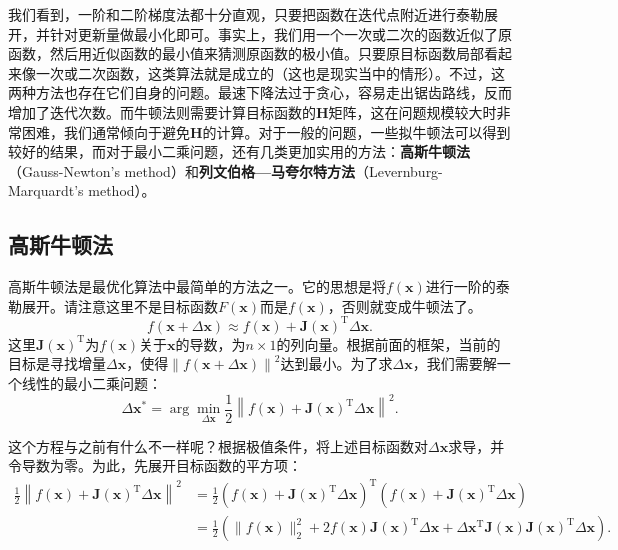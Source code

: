 我们看到，一阶和二阶梯度法都十分直观，只要把函数在迭代点附近进行泰勒展开，并针对更新量做最小化即可。事实上，我们用一个一次或二次的函数近似了原函数，然后用近似函数的最小值来猜测原函数的极小值。只要原目标函数局部看起来像一次或二次函数，这类算法就是成立的（这也是现实当中的情形）。不过，这两种方法也存在它们自身的问题。最速下降法过于贪心，容易走出锯齿路线，反而增加了迭代次数。而牛顿法则需要计算目标函数的$\bm{H}$矩阵，这在问题规模较大时非常困难，我们通常倾向于避免$\bm{H}$的计算。对于一般的问题，一些拟牛顿法可以得到较好的结果，而对于最小二乘问题，还有几类更加实用的方法：\textbf{高斯牛顿法}（Gauss-Newton's method）和\textbf{列文伯格—马夸尔特方法}（Levernburg-Marquardt's method）。

\subsection{高斯牛顿法}
高斯牛顿法是最优化算法中最简单的方法之一。它的思想是将$f(\bm{x})$进行一阶的泰勒展开。请注意这里不是目标函数$F(\bm{x})$而是$f(\bm{x})$，否则就变成牛顿法了。
\begin{equation}
\label{eq:approximation}
f\left( {\bm{x} + \Delta \bm{x}} \right) \approx f\left( \bm{x} \right) + \bm{J} \left( \bm{x} \right)^\mathrm{T} \Delta \bm{x}.
\end{equation}
这里$\bm{J}(\bm{x})^\mathrm{T}$为$f(\bm{x})$关于$\bm{x}$的导数，为$n \times 1$的列向量。根据前面的框架，当前的目标是寻找增量$\Delta \bm{x}$，使得$\left\| {f\left( \bm{x} + \Delta \bm{x} \right)} \right \|^2$达到最小。为了求$\Delta \bm{x}$，我们需要解一个线性的最小二乘问题：
\begin{equation}
\Delta \bm{x}^* = \arg \mathop {\min }\limits_{\Delta \bm{x}} \frac{1}{2}{\left\| {f\left( \bm{x} \right) + \bm{J} \left( \bm{x} \right)^\mathrm{T} \Delta \bm{x} } \right\|^2}.
\end{equation}

这个方程与之前有什么不一样呢？根据极值条件，将上述目标函数对$\Delta \bm{x}$求导，并令导数为零。为此，先展开目标函数的平方项：
\begin{align*}
\frac{1}{2}{\left\| {f\left( \bm{x} \right) + \bm{J} \left( \bm{x} \right)^\mathrm{T} \Delta \bm{x}} \right\|^2} &= \frac{1}{2}{\left( {f\left( \bm{x} \right) + \bm{J}\left( \bm{x} \right)^\mathrm{T} \Delta \bm{x}} \right)^\mathrm{T}}\left( {f\left( \bm{x} \right) + \bm{J} \left( \bm{x} \right)^\mathrm{T} \Delta \bm{x}} \right)\\
&= \frac{1}{2}\left( \| f{{\left( \bm{x} \right)}\|^2_2 + 2 f\left( \bm{x} \right) \bm{J} {{\left( \bm{x} \right)}}^\mathrm{T} \Delta \bm{x} + \Delta { \bm{x}^\mathrm{T}}{\bm{J} (\bm{x})} \bm{J}(\bm{x})^\mathrm{T} \Delta \bm{x}} \right).
\end{align*}


